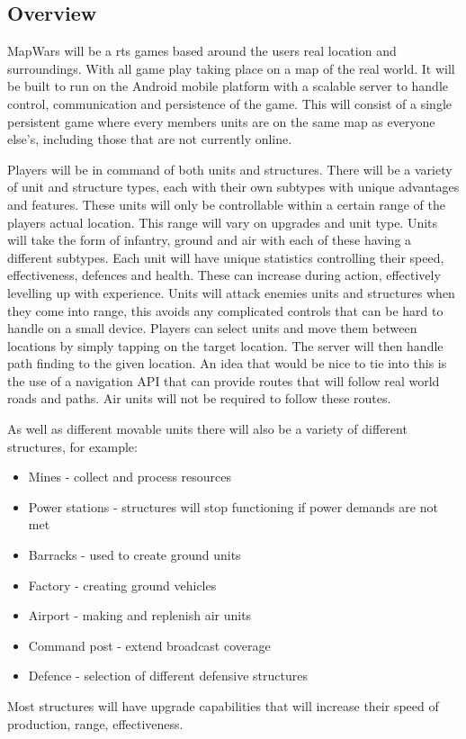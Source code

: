 \documentclass[11pt,fleqn,twoside]{article}
\begin{document}
\subsection{Overview}
MapWars will be a \gls{rts} games based around the users real location and surroundings. With all game play taking place on a map of the real world. It will be built to run on the Android mobile platform with a scalable server to handle control, communication and persistence of the game. This will consist of a single persistent game where every members units are on the same map as everyone else's, including those that are not currently online.

Players will be in command of both units and structures. There will be a variety of unit and structure types, each with their own subtypes with unique advantages and features. These units will only be controllable within a certain range of the players actual location. This range will vary on upgrades and unit type. Units will take the form of infantry, ground and air with each of these having a different subtypes. Each unit will have unique statistics controlling their speed, effectiveness, defences and health. These can increase during action, effectively levelling up with experience. Units will attack enemies units and structures when they come into range, this avoids any complicated controls that can be hard to handle on a small device. Players can select units and move them between locations by simply tapping on the target location. The server will then handle path finding to the given location. An idea that would be nice to tie into this is the use of a navigation API that can provide routes that will follow real world roads and paths. Air units will not be required to follow these routes.

As well as different movable units there will also be a variety of different structures, for example:\begin{itemize}
\item Mines - collect and process resources
\item Power stations - structures will stop functioning if power demands are not met
\item Barracks - used to create ground units
\item Factory - creating ground vehicles
\item Airport - making and replenish air units
\item Command post - extend broadcast coverage
\item Defence - selection of different defensive structures
\end{itemize}
Most structures will have upgrade capabilities that will increase their speed of production, range, effectiveness. 
\end{document}
